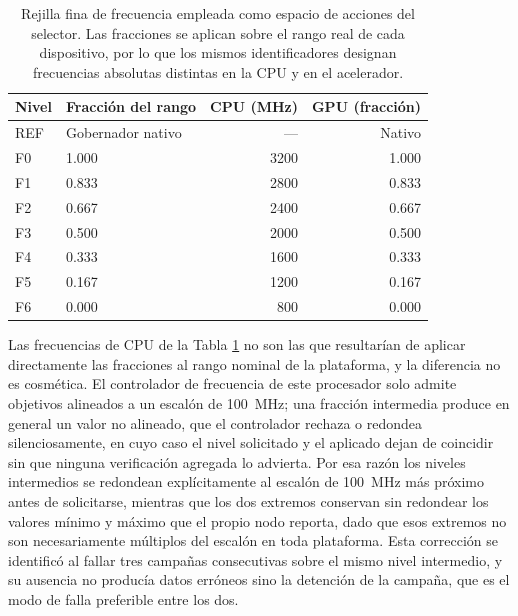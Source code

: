 \documentclass[12pt,oneside,spanish]{book}
\begin{document}
\begin{table}[H]
\centering
\caption[Rejilla fina de frecuencia]{Rejilla fina de frecuencia empleada como espacio de acciones del selector. Las fracciones se aplican sobre el rango real de cada dispositivo, por lo que los mismos identificadores designan frecuencias absolutas distintas en la CPU y en el acelerador.}
\label{tab:frecuencias-fina}
\begin{tabular}{@{}llrr@{}}
\toprule
\textbf{Nivel} & \textbf{Fracción del rango} & \textbf{CPU (MHz)} & \textbf{GPU (fracción)} \\
\midrule
REF & Gobernador nativo & --- & Nativo \\
F0 & 1.000 & 3200 & 1.000 \\
F1 & 0.833 & 2800 & 0.833 \\
F2 & 0.667 & 2400 & 0.667 \\
F3 & 0.500 & 2000 & 0.500 \\
F4 & 0.333 & 1600 & 0.333 \\
F5 & 0.167 & 1200 & 0.167 \\
F6 & 0.000 & 800 & 0.000 \\
\bottomrule
\end{tabular}
\end{table}

Las frecuencias de CPU de la Tabla \ref{tab:frecuencias-fina} no son las que resultarían de aplicar directamente las fracciones al rango nominal de la plataforma, y la diferencia no es cosmética. El controlador de frecuencia de este procesador solo admite objetivos alineados a un escalón de 100~MHz; una fracción intermedia produce en general un valor no alineado, que el controlador rechaza o redondea silenciosamente, en cuyo caso el nivel solicitado y el aplicado dejan de coincidir sin que ninguna verificación agregada lo advierta. Por esa razón los niveles intermedios se redondean explícitamente al escalón de 100~MHz más próximo antes de solicitarse, mientras que los dos extremos conservan sin redondear los valores mínimo y máximo que el propio nodo reporta, dado que esos extremos no son necesariamente múltiplos del escalón en toda plataforma. Esta corrección se identificó al fallar tres campañas consecutivas sobre el mismo nivel intermedio, y su ausencia no producía datos erróneos sino la detención de la campaña, que es el modo de falla preferible entre los dos.
\end{document}
